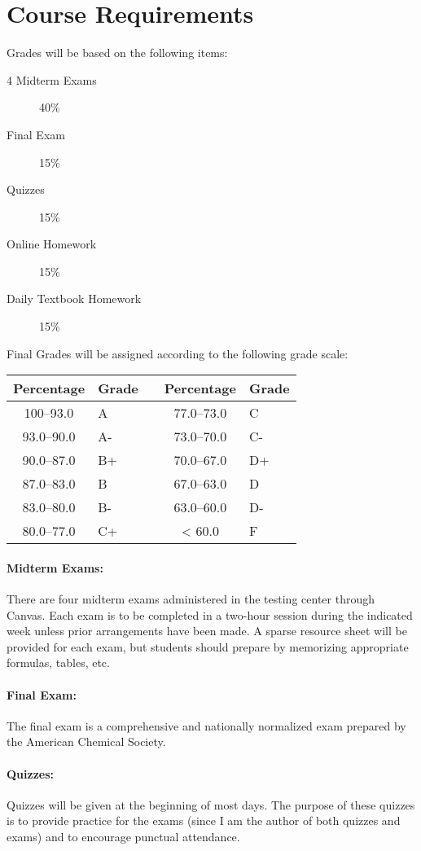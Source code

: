 \documentclass[12pt, letterpaper]{article}
\begin{document}
\section*{Course Requirements}
Grades will be based on the following items:
\begin{description}
	\item[4 Midterm Exams] 40\%
	\item[Final Exam] 15\%
	\item[Quizzes] 15\%
	\item[Online Homework] 15\%
	\item[Daily Textbook Homework] 15\%
\end{description}
Final Grades will be assigned according to the following grade scale:

\begin{tabular}{cl|c|cl}
	Percentage & Grade &  & Percentage & Grade \\ \midrule
	100--93.0  & A     &  & 77.0--73.0 & C     \\
	93.0--90.0 & A-    &  & 73.0--70.0 & C-    \\
	90.0--87.0 & B+    &  & 70.0--67.0 & D+    \\
	87.0--83.0 & B     &  & 67.0--63.0 & D     \\
	83.0--80.0 & B-    &  & 63.0--60.0 & D-    \\
	80.0--77.0 & C+    &  & < 60.0     & F
\end{tabular}

\paragraph{Midterm Exams:}
There are four midterm exams administered in the testing center through Canvas. Each exam is to be completed in a two-hour session during the indicated week unless prior arrangements have been made. A sparse resource sheet will be provided for each exam, but students should prepare by memorizing appropriate formulas, tables, etc.

\paragraph{Final Exam:}
The final exam is a comprehensive and nationally normalized exam prepared by the American Chemical Society.

\paragraph{Quizzes:}
Quizzes will be given at the beginning of most days. The purpose of these quizzes is to provide practice for the exams (since I am the author of both quizzes and exams) and to encourage punctual attendance.
\end{document}
